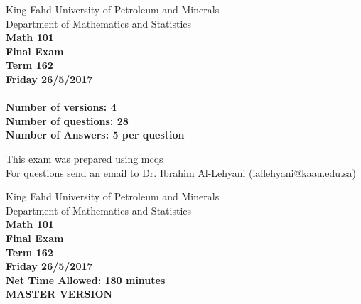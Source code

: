 \documentclass[amsfonts,bezier,leqno,fleqn,12pt,a4paper]{article}
\begin{document}
\begin{center}
\begin{large}

King Fahd University of Petroleum and Minerals\\
Department of Mathematics and Statistics\\
\vspace*{2cm}
{\bf Math 101}  \\
{\bf Final Exam}  \\
{\bf Term 162}  \\
{\bf Friday 26/5/2017}  \\

\vspace*{3cm}
{\bf{\Huge{}}}\\
\vspace*{2cm}
{\bf Number of versions: 4 }  \\
{\bf Number of questions: 28 }  \\
{\bf Number of Answers: 5 per question}  \\

\end{large}
\vfill

\tiny{This exam was prepared using mcqs\\}
\tiny{For questions send an email to Dr. Ibrahim Al-Lehyani (iallehyani@kaau.edu.sa)\\}

\end{center}

\newpage


\thispagestyle{empty}

\begin{center}
\begin{large}

King Fahd University of Petroleum and Minerals\\
Department of Mathematics and Statistics\\
\vspace*{4cm}
{\bf Math 101} \\
{\bf Final Exam}  \\
{\bf Term 162}  \\
{\bf Friday 26/5/2017}  \\
{\bf Net Time Allowed: 180 minutes}  \\
\vspace*{6cm}
{\bf {\Huge{MASTER VERSION}}}  \\

\end{large}
\end{center}
\end{document}
